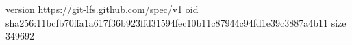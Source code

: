 version https://git-lfs.github.com/spec/v1
oid sha256:11bcfb70ffa1a617f36b923ffd31594fec10b11c87944c94fd1e39c3887a4b11
size 349692
